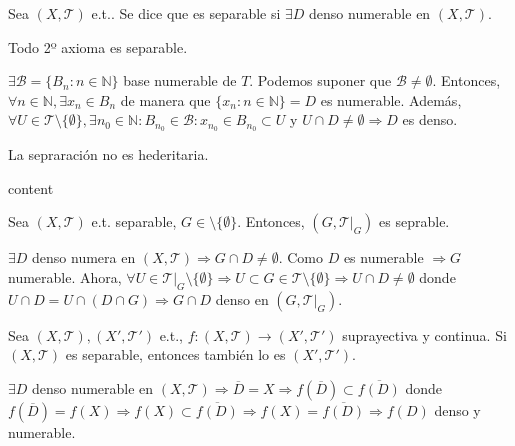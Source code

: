 \begin{defn}
  Sea $( X, \mathcal{T} )$ e.t.. Se dice que es separable si $\exists D$ denso numerable en $( X, \mathcal{T} )$.
\end{defn}

\begin{prop}
  Todo 2º axioma es separable.
\end{prop}

\begin{dem}
  $\exists \mathcal{B} = \{  B_{n} : n \in \mathbb{N} \}$ base numerable de $T$. Podemos suponer que $\mathcal{B} \neq \emptyset$. Entonces, $\forall n \in \mathbb{N}, \exists x_{n} \in B_{n}$ de manera que $\{ x_{n} : n \in \mathbb{N} \} = D$ es numerable. Además, $\forall U \in \mathcal{T} \setminus \{ \emptyset \}, \exists n_{0} \in \mathbb{N} : B_{n_{0}} \in \mathcal{B} : x_{n_{0}} \in B_{n_{0}}\subset U$ y $U \cap D \neq \emptyset \Rightarrow D$ es denso.
\end{dem}

\begin{obs}
  La sepraración no es hederitaria.
\end{obs}

\begin{dem}
  content
\end{dem}

\begin{prop}
  Sea $( X, \mathcal{T} )$ e.t. separable, $G \in \mathcal{ \setminus \{  \emptyset \}}$. Entonces, $( G, \mathcal{T}|_{G})$ es seprable.
\end{prop}

\begin{dem}
  $\exists D$ denso numera en $( X, \mathcal{T} ) \Rightarrow G \cap D \neq \emptyset$. Como $D$ es numerable $\Rightarrow G$ numerable. Ahora, $\forall U \in \mathcal{T}|_{G} \setminus \{  \emptyset \} \Rightarrow U \subset G \in \mathcal{T} \setminus \{  \emptyset \} \Rightarrow U \cap D \neq \emptyset$ donde $ U \cap D = U \cap (D \cap G) \Rightarrow G \cap D$ denso en $( G, \mathcal{T}|_{G})$.
\end{dem}

\begin{prop}
  Sea $( X, \mathcal{T} ), ( X', \mathcal{T}' )$ e.t., $f: ( X, \mathcal{T} ) \to ( X', \mathcal{T}' )$ suprayectiva y continua. Si $( X, \mathcal{T} )$ es separable, entonces también lo es $( X', \mathcal{T}' )$.
\end{prop}

\begin{dem}
  $\exists D$ denso numerable en $( X, \mathcal{T} ) \Rightarrow \overline{D} = X \Rightarrow f(\overline{D}) \subset \overline{f(D)}$ donde $f(\overline{D}) = f(X) \Rightarrow f(X) \subset \overline{f(D)} \Rightarrow f(X) = \overline{f(D)} \Rightarrow f(D)$ denso y numerable.
\end{dem}

